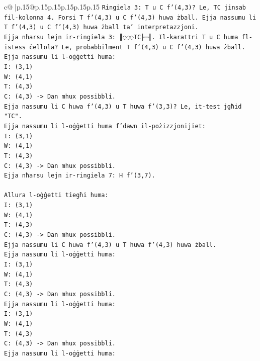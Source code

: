 \documentclass{article}
\begin{document}
{\begin{supertabular}{c@{$\;$}|p{.15\linewidth}@{}p{.15\linewidth}p{.15\linewidth}p{.15\linewidth}p{.15\linewidth}p{.15\linewidth}}
{{{\texttt{Ringiela 3: T u C f'(4,3)? Le, TC jinsab fil{-}kolonna 4. Forsi T f'(4,3) u C f'(4,3) huwa żball. Ejja nassumu li T f'(4,3) u C f'(4,3) huwa żball ta' interpretazzjoni.} \\
\texttt{Ejja nħarsu lejn ir{-}ringiela 3: ║◌◌◌TC├─╢. Il{-}karattri T u C huma fl{-}istess ċellola? Le, probabbilment T f'(4,3) u C f'(4,3) huwa żball.} \\
\texttt{Ejja nassumu li l{-}oġġetti huma:} \\
\texttt{I: (3,1)} \\
\texttt{W: (4,1)} \\
\texttt{T: (4,3)} \\
\texttt{C: (4,3) {-}> Dan mhux possibbli.} \\
\texttt{Ejja nassumu li C huwa f'(4,3) u T huwa f'(3,3)? Le, it{-}test jgħid "TC".} \\
\texttt{Ejja nassumu li l{-}oġġetti huma f'dawn il{-}pożizzjonijiet:} \\
\texttt{I: (3,1)} \\
\texttt{W: (4,1)} \\
\texttt{T: (4,3)} \\
\texttt{C: (4,3) {-}> Dan mhux possibbli.} \\
\texttt{Ejja nħarsu lejn ir{-}ringiela 7: H f'(3,7).} \\
\\ 
\texttt{Allura l{-}oġġetti tiegħi huma:} \\
\texttt{I: (3,1)} \\
\texttt{W: (4,1)} \\
\texttt{T: (4,3)} \\
\texttt{C: (4,3) {-}> Dan mhux possibbli.} \\
\texttt{Ejja nassumu li C huwa f'(4,3) u T huwa f'(4,3) huwa żball.} \\
\texttt{Ejja nassumu li l{-}oġġetti huma:} \\
\texttt{I: (3,1)} \\
\texttt{W: (4,1)} \\
\texttt{T: (4,3)} \\
\texttt{C: (4,3) {-}> Dan mhux possibbli.} \\
\texttt{Ejja nassumu li l{-}oġġetti huma:} \\
\texttt{I: (3,1)} \\
\texttt{W: (4,1)} \\
\texttt{T: (4,3)} \\
\texttt{C: (4,3) {-}> Dan mhux possibbli.} \\
\texttt{Ejja nassumu li l{-}oġġetti huma:} \\
}}}
\end{supertabular}}
\end{document}
